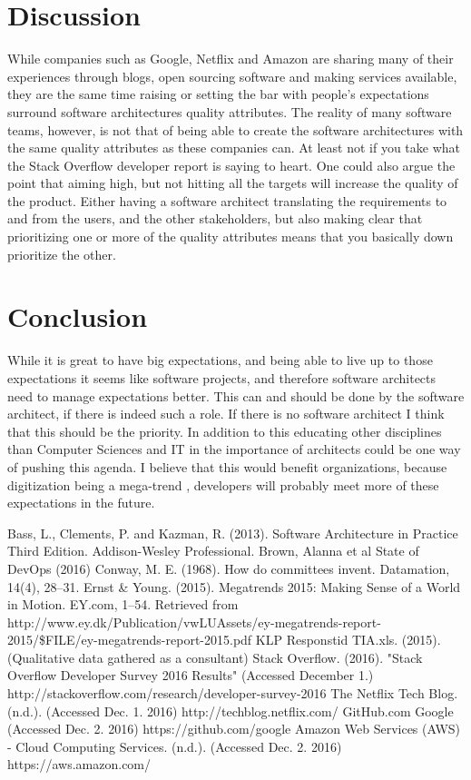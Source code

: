 \documentclass[a4paper, 10pt, conference]{IEEEtran}
\begin{document}
\section{Discussion}
While companies such as Google, Netflix and Amazon are sharing many of their experiences through blogs\cite{netflix}, open sourcing software\cite{github-google} and making services available\cite{amazon}, they are the same time raising or setting the bar with people’s expectations surround software architectures quality attributes.
The reality of many software teams, however, is not that of being able to create the software architectures with the same quality attributes as these companies can. At least not if you take what the Stack Overflow developer report \cite{c6} is saying to heart.
One could also argue the point that aiming high, but not hitting all the targets will increase the quality of the product.
Either having a software architect translating the requirements to and from the users, and the other stakeholders, but also making clear that prioritizing one or more of the quality attributes \cite{c1} means that you basically down prioritize the other. 

\section{Conclusion}
While it is great to have big expectations, and being able to live up to those expectations it seems like software projects, and therefore software architects need to manage expectations better. This can and should be done by the software architect, if there is indeed such a role. If there is no software architect I think that this should be the priority. 
In addition to this educating other disciplines than Computer Sciences and IT in the importance of architects could be one way of pushing this agenda.
I believe that this would benefit organizations, because digitization being a mega-trend \cite{c4}, developers will probably meet more of these expectations in the future.
\begin{thebibliography}{99}

 Bass, L., Clements, P. and Kazman, R. (2013). Software Architecture in Practice Third Edition. Addison-Wesley Professional.
Brown, Alanna et al State of DevOps (2016)
Conway, M. E. (1968). How do committees invent. Datamation, 14(4), 28–31.
Ernst \& Young. (2015). Megatrends 2015: Making Sense of a World in Motion. EY.com, 1–54. Retrieved from http://www.ey.dk/Publication/vwLUAssets/ey-megatrends-report-2015/\$FILE/ey-megatrends-report-2015.pdf
KLP Responstid TIA.xls. (2015). (Qualitative data gathered as a consultant)
Stack Overflow. (2016). "Stack Overflow Developer Survey 2016 Results" (Accessed December 1.) http://stackoverflow.com/research/developer-survey-2016
 The Netflix Tech Blog. (n.d.). (Accessed Dec. 1. 2016) http://techblog.netflix.com/
 GitHub.com Google (Accessed Dec. 2. 2016) https://github.com/google
 Amazon Web Services (AWS) - Cloud Computing Services. (n.d.). (Accessed Dec. 2. 2016) https://aws.amazon.com/

\end{thebibliography}
\end{document}
